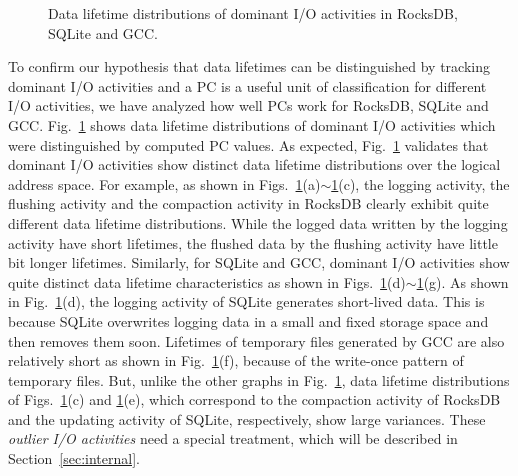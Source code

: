 \begin{figure}[!t]
	\hspace{2pt}
	\hfill
\caption{Data lifetime distributions of dominant I/O activities in RocksDB, SQLite and GCC.} 
\label{fig:types_and_PCs}
\end{figure}


To confirm our hypothesis that data lifetimes can be distinguished by tracking
dominant I/O activities and a PC is a useful unit of classification for
different I/O activities, we have analyzed how well PCs work for RocksDB,
SQLite and GCC.  Fig.~\ref{fig:types_and_PCs} shows data lifetime distributions
of dominant I/O activities which were distinguished by computed PC values.  As
expected, Fig.~\ref{fig:types_and_PCs} validates that dominant I/O activities
show distinct data lifetime distributions over the logical address space.  For
example, as shown in
Figs.~\ref{fig:types_and_PCs}(a)$\sim$\ref{fig:types_and_PCs}(c), the logging
activity, the flushing activity and the compaction activity in RocksDB clearly
exhibit quite different data lifetime distributions.  While the logged data
written by the logging activity have short lifetimes, the flushed data by the
flushing activity have little bit longer lifetimes.  Similarly, for SQLite and
GCC, dominant I/O activities show quite distinct data lifetime characteristics
as shown in Figs.~\ref{fig:types_and_PCs}(d)$\sim$\ref{fig:types_and_PCs}(g).
As shown in Fig.~\ref{fig:types_and_PCs}(d), the logging activity of SQLite
generates short-lived data.  This is because SQLite overwrites logging data in
a small and fixed storage space and then removes them soon.  Lifetimes of
temporary files generated by GCC are also relatively short as shown in
Fig.~\ref{fig:types_and_PCs}(f), because of the write-once pattern of temporary
files.  But, unlike the other graphs in Fig.~\ref{fig:types_and_PCs}, data
lifetime distributions of Figs.~\ref{fig:types_and_PCs}(c) and
\ref{fig:types_and_PCs}(e), which correspond to the compaction activity of
RocksDB and the updating activity of SQLite, respectively, show large
variances.  These {\it outlier I/O activities} need a special treatment, which
will be described in Section~\ref{sec:internal}.

